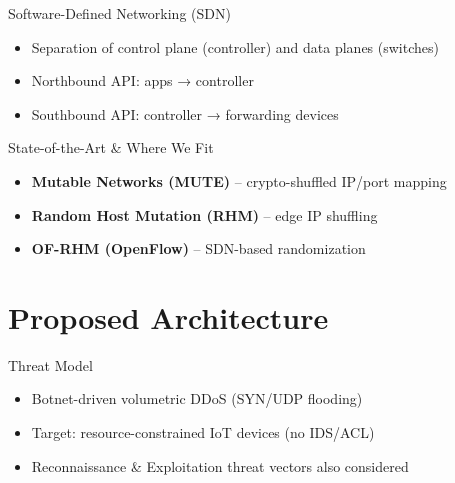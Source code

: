 \documentclass{beamer}
\begin{document}
\begin{frame}{Software-Defined Networking (SDN)}
  \begin{itemize}
    \item Separation of control plane (controller) and data planes (switches)  
    \item Northbound API: apps → controller  
    \item Southbound API: controller → forwarding devices  
  \end{itemize}
\end{frame}

\begin{frame}{State-of-the-Art \& Where We Fit}
\begin{itemize}
    \item \textbf{Mutable Networks (MUTE)} – crypto-shuffled IP/port mapping
    \item \textbf{Random Host Mutation (RHM)} – edge IP shuffling
    \item \textbf{OF-RHM (OpenFlow)} – SDN-based randomization
  \end{itemize}
\end{frame}

\section{Proposed Architecture}

\begin{frame}{Threat Model}
  \begin{itemize}
    \item Botnet-driven volumetric DDoS (SYN/UDP flooding)  
    \item Target: resource-constrained IoT devices (no IDS/ACL)
    \item Reconnaissance \& Exploitation threat vectors also considered
  \end{itemize}
\end{frame}
\end{document}

